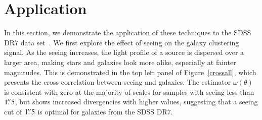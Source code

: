 \documentclass[11pt,twoside]{article}
\begin{document}
\section{Application}
In this section, we demonstrate the application of these techniques to the SDSS DR7 data set~\citep{sdssdr7}. We first explore the effect of seeing on the galaxy clustering signal. As the seeing increases, the light profile of a source is dispersed over a larger area, making stars and galaxies look more alike, especially at fainter magnitudes. This is demonstrated in the top left panel of Figure~\ref{crossall}, which presents the cross-correlation between seeing and galaxies. The estimator $\omega(\theta)$ is consistent with zero at the majority of scales for samples with seeing less than $1\hbox{$.\!\!^{\prime\prime}$}5$, but shows increased divergencies with higher values, suggesting that a seeing cut of $1\hbox{$.\!\!^{\prime\prime}$}5$ is optimal for galaxies from the SDSS DR7.
\end{document}
